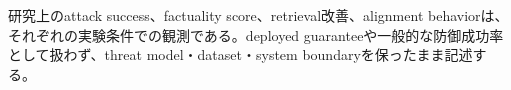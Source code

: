 \begin{claimboundary}
研究上のattack success、factuality score、retrieval改善、alignment behaviorは、それぞれの実験条件での観測である。deployed guaranteeや一般的な防御成功率として扱わず、threat model・dataset・system boundaryを保ったまま記述する。\autocite{src-e7b786f4a622}
\end{claimboundary}
